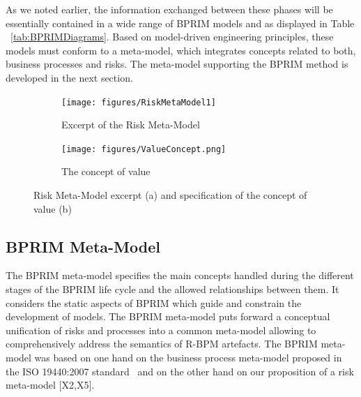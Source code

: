 \documentclass[preprint,3p,times,number]{elsarticle}
\begin{document}
As we noted earlier, the information exchanged between these phases will be essentially contained in a wide range of BPRIM models and as displayed in Table ~\ref{tab:BPRIMDiagrams}. Based on model-driven engineering principles, these models must conform to a meta-model, which integrates concepts related to both, business processes and risks. The meta-model supporting the BPRIM method is developed in the next section.

\begin{figure}[t]
    \centering
        \begin{subfigure}{0.66\textwidth}
         \begin{center}
            \texttt{[image: figures/RiskMetaModel1]}
            \caption{Excerpt of the Risk Meta-Model}
            \label{fig:RiskMetaModel}
         \end{center}
        \end{subfigure}
    \hfill
        \begin{subfigure}{0.33\textwidth}
         \begin{center}
            \texttt{[image: figures/ValueConcept.png]}
            \caption{The concept of value}
            \label{fig:ValueModel}
         \end{center}
        \end{subfigure}
    \caption{Risk Meta-Model excerpt (a) and specification of the concept of value (b)}
    \label{fig:relationsInMetamodel:Generic}
    \vspace{-.2cm}
\end{figure}

\subsection{BPRIM Meta-Model}
\label{sec:bprim:metamodel}
The BPRIM meta-model specifies the main concepts handled during the different stages of the BPRIM life cycle and the allowed relationships between them. It considers the static aspects of BPRIM which guide and constrain the development of models. The BPRIM meta-model puts forward a conceptual unification of risks and processes into a common meta-model allowing to comprehensively address the semantics of R-BPM artefacts. The BPRIM meta-model was based on one hand on the business process meta-model proposed in the ISO 19440:2007 standard~\cite{iso_iso_2007} and on the other hand on our proposition of a risk meta-model [X2,X5]. %
\end{document}
